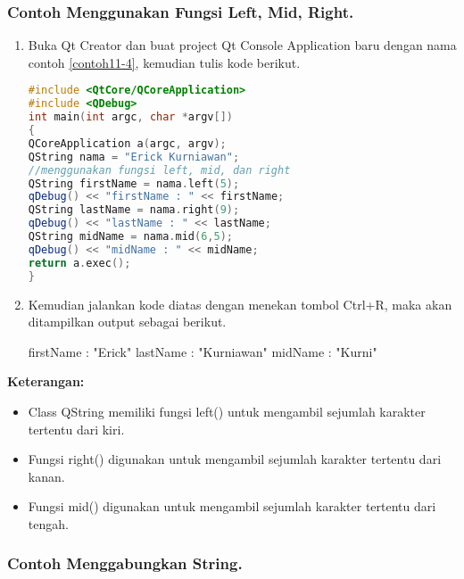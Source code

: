\subsubsection*{Contoh  Menggunakan Fungsi Left, Mid, Right.}

\begin{enumerate}

\item
  Buka Qt Creator dan buat project Qt Console Application baru dengan
  nama contoh \ref{contoh11-4}, kemudian tulis kode berikut.

\begin{lstlisting}[language=c++,caption= Menggunakan Fungsi Left Mid Right, label=contoh11-4]
#include <QtCore/QCoreApplication>
#include <QDebug>
int main(int argc, char *argv[])
{
QCoreApplication a(argc, argv);
QString nama = "Erick Kurniawan";
//menggunakan fungsi left, mid, dan right
QString firstName = nama.left(5);
qDebug() << "firstName : " << firstName;
QString lastName = nama.right(9);
qDebug() << "lastName : " << lastName;
QString midName = nama.mid(6,5);
qDebug() << "midName : " << midName;
return a.exec();
}
\end{lstlisting}
\item
  Kemudian jalankan kode diatas dengan menekan tombol Ctrl+R, maka akan
  ditampilkan output sebagai berikut.

  \begin{lcverbatim}
firstName :  "Erick"
lastName :  "Kurniawan"
midName :  "Kurni"
\end{lcverbatim}
\end{enumerate}

\textbf{Keterangan:}

\begin{itemize}

\item
  Class QString memiliki fungsi left() untuk mengambil sejumlah karakter
  tertentu dari kiri.
\item
  Fungsi right() digunakan untuk mengambil sejumlah karakter tertentu
  dari kanan.
\item
  Fungsi mid() digunakan untuk mengambil sejumlah karakter tertentu dari
  tengah.
\end{itemize}

\subsubsection*{Contoh Menggabungkan String.}

